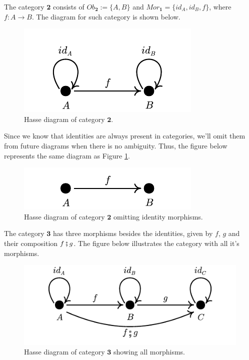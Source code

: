 \begin{example}
  The category $\bm 2$ consists of $Ob_{\bm 2} := \{A, B\}$ and $Mor_{\bm 1} = \{id_A, id_B, f\}$,
  where $f:A \to B$.
  The diagram for such category is shown below.
  \begin{figure}[H]
    \begin{center}
      \includegraphics{./notebooks/2Cat}
    \end{center}
    \caption{Hasse diagram of category $\bm 2$.}
    \label{fig:2Cat}
  \end{figure}

Since we know that identities are always present in categories, we'll
omit them from future diagrams when there is no ambiguity. Thus,
the figure below represents the same diagram as Figure \ref{fig:2Cat}.
\begin{figure}[H]
  \begin{center}
    \includegraphics{./notebooks/2Catsimple}
  \end{center}
  \caption{Hasse diagram of category $\bm 2$ omitting identity morphisms.}
  \label{fig:2Catsimple}
\end{figure}

The category $\bm 3$ has three morphisms besides the identities, given
by $f$, $g$ and their composition $f \fatsemi g$. The figure below
illustrates the category with all it's morphisms.

\begin{figure}[H]
  \begin{center}
    \includegraphics{./notebooks/3CatComplete}
  \end{center}
  \caption{Hasse diagram of category $\bm 3$ showing all morphisms.}
  \label{fig:3Catcomplete}
\end{figure}


\end{example}
